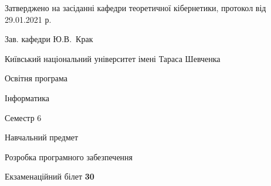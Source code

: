 \documentclass[10pt, ukrainian]{article}
\begin{document}
{\vspace{5mm}\smallskip \begin {small} Затверджено на засіданні кафедри теоретичної кібернетики, протокол  від   29.01.2021 р.\par\smallskip\smallskip
{\parbox {6.5 cm}{Зав. кафедри \dotfill Ю.В.~Крак}} \end{small}}
\newpage

{{\begin {small}\par
{ \center  Київський національний університет імені Тараса Шевченка \par}
{\parbox {5 cm}{Освітня програма \hfill}{\parbox {7 cm}{Інформатика \hfill}}\parbox {6 cm}{\hfill Семестр 6}}\par
{\parbox {5 cm} {Навчальний предмет \hfill}\parbox {7 cm}{Розробка програмного забезпечення \hfill}\parbox {6cm}{\hfill}\par}\vspace{-7pt} \end{small}}{\center Екзаменаційний білет \No \textbf
{ 30 }\par}}
\end{document}
